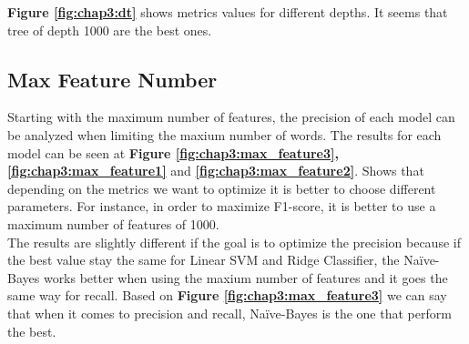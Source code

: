 \textbf{Figure \ref{fig:chap3:dt}} shows metrics values for different depths. It seems that tree of depth 1000 are the best ones. 
\subsection{Max Feature Number}

Starting with the maximum number of features, the precision of each model can be analyzed when limiting the maxium number of words. The results for each model can be seen at \textbf{Figure \ref{fig:chap3:max_feature3}, \ref{fig:chap3:max_feature1}} and \textbf{\ref{fig:chap3:max_feature2}}. Shows that depending on the metrics we want to optimize it is better to choose different parameters. For instance, in order to maximize F1-score, it is better to use a maximum number of features of 1000.\\

The results are slightly different if the goal is to optimize the precision because if the best value stay the same for Linear SVM and Ridge Classifier, the Naïve-Bayes works better when using the maxium number of features and it goes the same way for recall. 
Based on \textbf{Figure \ref{fig:chap3:max_feature3}} we can say that when it comes to precision and recall, Naïve-Bayes is the one that perform the best.\\

